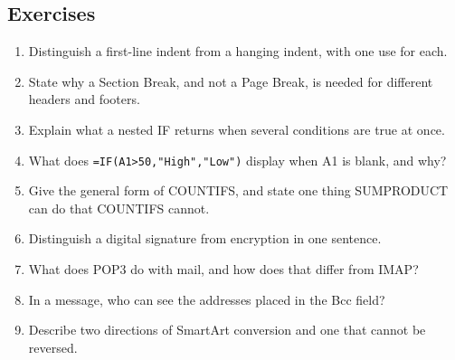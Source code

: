 \subsection*{Exercises}
\begin{enumerate}[label=\arabic*.]
  \item Distinguish a first-line indent from a hanging indent, with one use
    for each.
  \item State why a Section Break, and not a Page Break, is needed for
    different headers and footers.
  \item Explain what a nested IF returns when several conditions are true at
    once.
  \item What does \texttt{=IF(A1>50,"High","Low")} display when A1 is blank,
    and why?
  \item Give the general form of COUNTIFS, and state one thing SUMPRODUCT can
    do that COUNTIFS cannot.
  \item Distinguish a digital signature from encryption in one sentence.
  \item What does POP3 do with mail, and how does that differ from IMAP?
  \item In a message, who can see the addresses placed in the Bcc field?
  \item Describe two directions of SmartArt conversion and one that cannot be
    reversed.
\end{enumerate}

